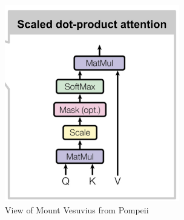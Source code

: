 \documentclass[12pt]{article}
\begin{document}
\begin{figure}[h!]
\centering
\includegraphics[width=3in]
{scaled-dot-prod-att.jpg}
\caption{View of Mount Vesuvius from
  Pompeii}
\label{fig-jpg}
\end{figure}
\end{document}
